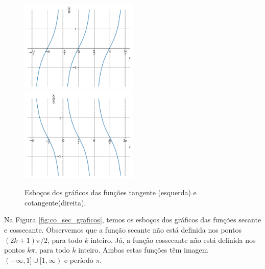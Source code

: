 \begin{figure}[H]
  \centering
  \includegraphics[width=0.5\textwidth]{./cap_funcao/dados/fig_co_tg_graficos/fig_tg_grafico}~
  \includegraphics[width=0.5\textwidth]{./cap_funcao/dados/fig_co_tg_graficos/fig_cotg_grafico}
  \caption{Esboços dos gráficos das funções tangente (esquerda) e cotangente(direita).}
  \label{fig:co_tg_graficos}
\end{figure}

Na Figura \ref{fig:co_sec_graficos}, temos os esboços dos gráficos das funções secante e cossecante. Observemos que a função secante não está definida nos pontos $(2k+1)\pi/2$, para todo $k$ inteiro. Já, a função cossecante não está definida nos pontos $k\pi$, para todo $k$ inteiro. Ambas estas funções têm imagem $(-\infty, 1]\cup [1, \infty)$ e período $\pi$.

